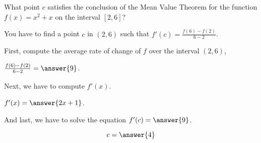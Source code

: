 \documentclass{ximera}
\author{Steven Gubkin\and Nela Lakos}
\begin{document}
\begin{exercise}

What point $c$ satisfies the conclusion of the Mean Value Theorem for the function $f(x) = x^2 +x$ on the interval
$[2,6]$?
\begin{hint}
You have to find a point $c$ in $(2,6)$ such that $f'(c)=\frac{f(6)-f(2)}{6-2}$.
\end{hint}
\begin{hint}
First, compute the average rate of change of $f$ over the interval $(2,6)$,

$\frac{f(6)-f(2)}{6-2}=\answer{9}$.
\end{hint}
\begin{hint}
Next, we have to compute $f'(x)$.

$f'(x)=\answer{2x+1}$.
\end{hint}
\begin{hint}
And last, we have to solve the equation
$f'(c)=\answer{9}$.
\end{hint}
\begin{prompt}
	$$c = \answer{4}$$
\end{prompt}

\end{exercise}
\end{document}
